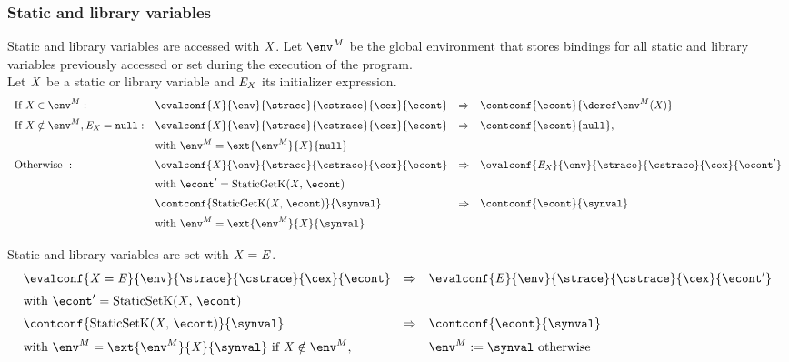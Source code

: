 \documentclass{article}
\begin{document}
\subsubsection{Static and library variables}
Static and library variables are accessed with $\mathit{X}$. Let $\env^{M}$ be the global environment that stores bindings for all static and library variables previously accessed or set during the execution of the program. \\
Let $\mathit{X}$ be a static or library variable and $\mathit{E}_{\mathit{X}}$ its initializer expression.
\newcommand{\StaticGetK}{\mathrm{StaticGetK}(\idmeta,\,\econt)}
\[
  \begin{array}{llcl}
	\textrm{If }\idmeta \in \env^{M}:
	&\evalconf{\StaticGet{\idmeta}}{\env}{\strace}{\cstrace}{\cex}{\econt}
	& \Rightarrow &
	\contconf{\econt}{\deref\env^{M}(\idmeta)}\\[2mm]

	\textrm{If }\idmeta \notin \env^{M}, \expressionmeta_{\idmeta} = \tt{null}:
	&\evalconf{\StaticGet{\idmeta}}{\env}{\strace}{\cstrace}{\cex}{\econt}
	& \Rightarrow &
	\contconf{\econt}{\tt{null}},\\[2mm]
	&\textrm{with }\env^{M} = \ext{\env^{M}}{\idmeta}{\tt{null}}\\[2mm]

	\textrm{Otherwise }:
	&\evalconf{\StaticGet{\idmeta}}{\env}{\strace}{\cstrace}{\cex}{\econt}
	& \Rightarrow &
	\evalconf{\expressionmeta_{\idmeta}}{\env}{\strace}{\cstrace}{\cex}{\econt'}\\[2mm]
	&\textrm{with }\econt' = \StaticGetK\\[2mm]

	&\contconf{\StaticGetK}{\synval}
	& \Rightarrow &
	\contconf{\econt}{\synval}\\[2mm]
	&\textrm{with }\env^{M} = \ext{\env^{M}}{\idmeta}{\synval}\\[2mm]
  \end{array}
\]
Static and library variables are set with $\mathit{X}=\mathit{E}$.
\newcommand{\StaticSetK}{\mathrm{StaticSetK}(\idmeta,\,\econt)}
\[
  \begin{array}{lcl}
	\evalconf{\StaticSet{\idmeta}{\expressionmeta}}{\env}{\strace}{\cstrace}{\cex}{\econt}
	& \Rightarrow &
	\evalconf{\expressionmeta}{\env}{\strace}{\cstrace}{\cex}{\econt'}\\[2mm]
	\textrm{with }\econt' = \StaticSetK\\[2mm]

	\contconf{\StaticSetK}{\synval}
	& \Rightarrow &
	\contconf{\econt}{\synval}\\[2mm]
	\textrm{with }\env^{M} = \ext{\env^{M}}{\idmeta}{\synval}
	\textrm{ if }\idmeta \notin \env^M,
	&&
	\update{\env^{M}}{\synval} \textrm{ otherwise}
	\\[2mm]
  \end{array}
\]
\end{document}
